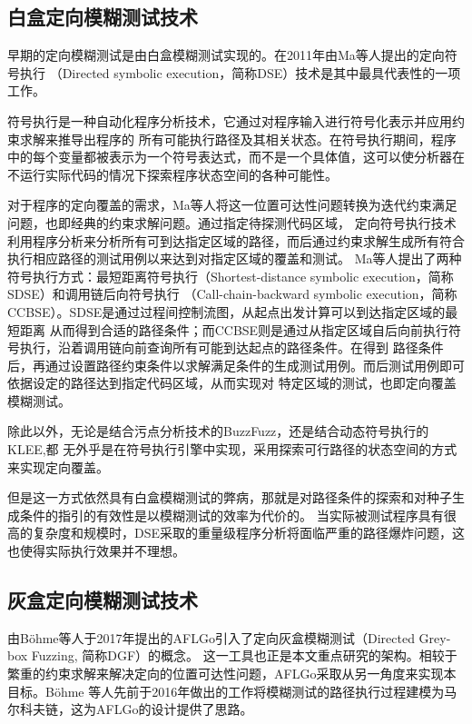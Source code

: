 \documentclass[bachelor]{njupthesis}
\begin{document}
\subsection{白盒定向模糊测试技术}
早期的定向模糊测试是由白盒模糊测试实现的。在2011年由Ma等人提出的定向符号执行\cite{ma2011directed}
（Directed symbolic execution，简称DSE）技术是其中最具代表性的一项工作。

符号执行\cite{king1976select}是一种自动化程序分析技术，它通过对程序输入进行符号化表示并应用约束求解来推导出程序的
所有可能执行路径及其相关状态。在符号执行期间，程序中的每个变量都被表示为一个符号表达式，而不是一个具体值，这可以使分析器在
不运行实际代码的情况下探索程序状态空间的各种可能性。

对于程序的定向覆盖的需求，Ma等人将这一位置可达性问题转换为迭代约束满足问题，也即经典的约束求解问题。通过指定待探测代码区域，
定向符号执行技术利用程序分析来分析所有可到达指定区域的路径，而后通过约束求解生成所有符合执行相应路径的测试用例以来达到对指定区域的覆盖和测试。
Ma等人提出了两种符号执行方式：最短距离符号执行（Shortest-distance symbolic execution，简称SDSE）和调用链后向符号执行
（Call-chain-backward symbolic execution，简称CCBSE）。SDSE是通过过程间控制流图，从起点出发计算可以到达指定区域的最短距离
从而得到合适的路径条件；而CCBSE则是通过从指定区域自后向前执行符号执行，沿着调用链向前查询所有可能到达起点的路径条件。在得到
路径条件后，再通过设置路径约束条件以求解满足条件的生成测试用例。而后测试用例即可依据设定的路径达到指定代码区域，从而实现对
特定区域的测试，也即定向覆盖模糊测试。

除此以外，无论是结合污点分析技术的BuzzFuzz\cite{ganesh2009taint}，还是结合动态符号执行的KLEE\cite{cadar2008klee},都
无外乎是在符号执行引擎中实现，采用探索可行路径的状态空间的方式来实现定向覆盖。

但是这一方式依然具有白盒模糊测试的弊病，那就是对路径条件的探索和对种子生成条件的指引的有效性是以模糊测试的效率为代价的。
当实际被测试程序具有很高的复杂度和规模时，DSE采取的重量级程序分析将面临严重的路径爆炸问题，这也使得实际执行效果并不理想。
\subsection{灰盒定向模糊测试技术}\label{sec:DGF}
由B{\"o}hme等人于2017年提出的AFLGo\cite{bohmeDGF2017}引入了定向灰盒模糊测试（Directed Grey-box Fuzzing, 简称DGF）的概念。
这一工具也正是本文重点研究的架构。相较于繁重的约束求解来解决定向的位置可达性问题，AFLGo采取从另一角度来实现本目标。B{\"o}hme
等人先前于2016年做出的工作\cite{2016Coverage}将模糊测试的路径执行过程建模为马尔科夫链，这为AFLGo的设计提供了思路。
\end{document}
